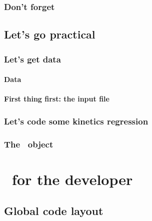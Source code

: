 \documentclass[twoside]{report}
\begin{document}
\section{\ViennaCL}

\section{\GRVY}

\section{Don't forget \Doxygen}
\label{dox}


\chapter{Let's go practical}
\chaptermark{\ANTIOCHPrac}
\label{Antioch:practice}

\section{Let's get data}

\subsection{Data}
\label{kin:data}


\subsection{First thing first: the input file}


\section{Let's code some kinetics regression}


\section{The \Units\ object}


\part{\Antioch\ for the developer}
\chapter{Global code layout}

\end{document}
